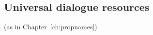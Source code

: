


  


  



 



\subsection{Universal dialogue resources} (as in Chapter~\ref{ch:propnames})


  

